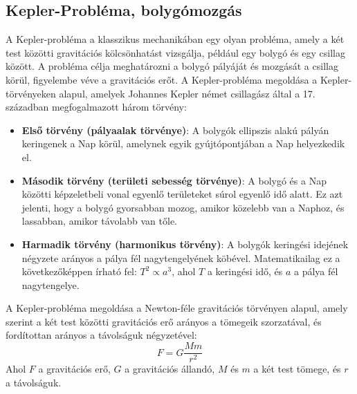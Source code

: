 \documentclass[../main.tex]{subfiles}
\begin{document}
\subsection{Kepler-Probléma, bolygómozgás}
A Kepler-probléma a klasszikus mechanikában egy olyan probléma, amely a két test közötti gravitációs kölcsönhatást vizsgálja, például egy bolygó és egy csillag között. A probléma célja meghatározni a bolygó pályáját és mozgását a csillag körül,
figyelembe véve a gravitációs erőt. A Kepler-probléma megoldása a Kepler-törvényeken alapul, amelyek Johannes Kepler német csillagász által a 17. században megfogalmazott három törvény:
\begin{itemize}
    \item \textbf{Első törvény (pályaalak törvénye)}: A bolygók ellipszis alakú pályán keringenek a Nap körül, amelynek egyik gyújtópontjában a Nap helyezkedik el.
    \item \textbf{Második törvény (területi sebesség törvénye)}: A bolygó és a Nap közötti képzeletbeli vonal egyenlő területeket súrol egyenlő idő alatt. Ez azt jelenti, hogy a bolygó gyorsabban mozog, amikor közelebb van a Naphoz, és lassabban, amikor távolabb van tőle.
    \item \textbf{Harmadik törvény (harmonikus törvény)}: A bolygók keringési idejének négyzete arányos a pálya fél nagytengelyének köbével. Matematikailag ez a következőképpen írható fel: $T^2 \propto a^3$, ahol $T$ a keringési idő, és $a$ a pálya fél nagytengelye.
\end{itemize}
A Kepler-probléma megoldása a Newton-féle gravitációs törvényen alapul, amely szerint a két test közötti gravitációs erő arányos a tömegeik szorzatával, és fordítottan arányos a távolságuk négyzetével:
\begin{equation}
    F = G \frac{M m}{r^2}
\end{equation}
Ahol $F$ a gravitációs erő, $G$ a gravitációs állandó, $M$ és $m$ a két test tömege, és $r$ a távolságuk. 
\end{document}
